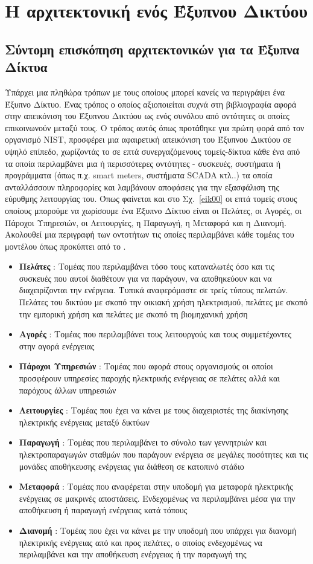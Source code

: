 \documentclass[12pt, a4paper, oneside]{report}
\begin{document}
\section{Η αρχιτεκτονική ενός Έξυπνου Δικτύου}

\subsection{Σύντομη επισκόπηση αρχιτεκτονικών για τα Έξυπνα Δίκτυα}\label{dipl}

Υπάρχει μια πληθώρα τρόπων με τους οποίους μπορεί κανείς να περιγράψει ένα Έξυπνο Δίκτυο. Ένας τρόπος ο οποίος αξιοποιείται συχνά στη βιβλιογραφία \cite{21,22} αφορά στην απεικόνιση του Έξυπνου Δικτύου ως ενός συνόλου από οντότητες οι οποίες επικοινωνούν μεταξύ τους. Ο τρόπος αυτός όπως προτάθηκε για πρώτη φορά από τον οργανισμό NIST, προσφέρει μια αφαιρετική απεικόνιση του Έξυπνου Δικτύου σε υψηλό επίπεδο, χωρίζοντάς το σε επτά συνεργαζόμενους τομείς-δίκτυα κάθε ένα από τα οποία περιλαμβάνει μια ή περισσότερες οντότητες - συσκευές, συστήματα ή προγράμματα (όπως π.χ. smart meters, συστήματα SCADA κτλ..) τα οποία ανταλλάσσουν πληροφορίες και λαμβάνουν αποφάσεις για την εξασφάλιση της εύρυθμης λειτουργίας του. Όπως φαίνεται και στο Σχ.~\ref{eik00} οι επτά τομείς στους οποίους μπορούμε να χωρίσουμε ένα Έξυπνο Δίκτυο είναι οι Πελάτες, οι Αγορές, οι Πάροχοι Υπηρεσιών, οι Λειτουργίες, η Παραγωγή, η Μεταφορά και η Διανομή. Ακολουθεί μια περιγραφή των οντοτήτων τις οποίες περιλαμβάνει κάθε τομέας του μοντέλου όπως προκύπτει από το \cite{21}.
\begin{itemize}
\item \textbf{Πελάτες} : Τομέας που περιλαμβάνει τόσο τους καταναλωτές όσο και τις συσκευές που αυτοί διαθέτουν για να παράγουν, να αποθηκεύουν και να διαχειρίζονται την ενέργεια. Τυπικά αναφερόμαστε σε τρείς τύπους πελατών. Πελάτες του δικτύου με σκοπό την οικιακή χρήση ηλεκτρισμού, πελάτες με σκοπό την εμπορική χρήση και πελάτες με σκοπό τη βιομηχανική χρήση
\item \textbf{Αγορές} : Τομέας που περιλαμβάνει τους λειτουργούς και τους συμμετέχοντες στην αγορά ενέργειας
\item \textbf{Πάροχοι Υπηρεσιών} : Τομέας που αφορά στους οργανισμούς οι οποίοι προσφέρουν υπηρεσίες παροχής ηλεκτρικής ενέργειας σε πελάτες αλλά και παρόχους άλλων υπηρεσιών
\item \textbf{Λειτουργίες} : Τομέας που έχει να κάνει με τους διαχειριστές της διακίνησης ηλεκτρικής ενέργειας μεταξύ δικτύων
\item \textbf{Παραγωγή} : Τομέας που περιλαμβάνει το σύνολο των γεννητριών και ηλεκτροπαραγωγών σταθμών που παράγουν ενέργεια σε μεγάλες ποσότητες και τις μονάδες αποθήκευσης ενέργειας για διάθεση σε κατοπινό στάδιο
\item \textbf{Μεταφορά} : Τομέας που αναφέρεται στην υποδομή για μεταφορά ηλεκτρικής ενέργειας σε μακρινές αποστάσεις. Ενδεχομένως να περιλαμβάνει μέσα για την αποθήκευση ή παραγωγή ενέργειας κατά τόπους
\item \textbf{Διανομή} : Τομέας που έχει να κάνει με την υποδομή που υπάρχει για διανομή ηλεκτρικής ενέργειας από και προς πελάτες, ο οποίος ενδεχομένως να περιλαμβάνει και την αποθήκευση ενέργειας ή την παραγωγή της
\end{itemize}
\end{document}
